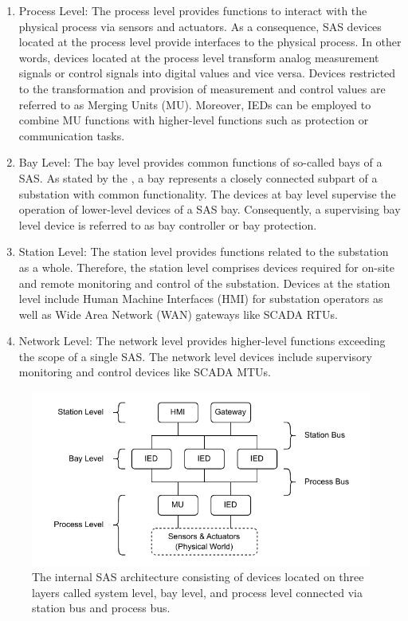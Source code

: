 \begin{enumerate}
    \item Process Level: The process level provides functions to interact with the physical process via sensors and actuators.
    As a consequence, SAS devices located at the process level provide interfaces to the physical process.
    In other words, devices located at the process level transform analog measurement signals or control signals into digital values and vice versa.
    Devices restricted to the transformation and provision of measurement and control values are referred to as Merging Units (MU).
    Moreover, IEDs can be employed to combine MU functions with higher-level functions such as protection or communication tasks.

    \item Bay Level: The bay level provides common functions of so-called bays of a SAS.
    As stated by the \citeauthor{IEC61850P5} \cite{IEC61850P5}, a bay represents a closely connected subpart of a substation with common functionality.
    The devices at bay level supervise the operation of lower-level devices of a SAS bay.
    Consequently, a supervising bay level device is referred to as bay controller or bay protection.

    \item Station Level: The station level provides functions related to the substation as a whole.
    Therefore, the station level comprises devices required for on-site and remote monitoring and control of the substation.
    Devices at the station level include Human Machine Interfaces (HMI) for substation operators as well as Wide Area Network (WAN) gateways like SCADA RTUs.

    \item Network Level: The network level provides higher-level functions exceeding the scope of a single SAS.
    The network level devices include supervisory monitoring and control devices like SCADA MTUs.
\end{enumerate}
\begin{figure}
	\centering
	\includegraphics[width=1.0\linewidth]{figures/substation_architecture.drawio.pdf}
	\caption{The internal SAS architecture consisting of devices located on three layers called system level, bay level, and process level connected via station bus and process bus.}
	\label{fig:substation_architecture}
\end{figure}


